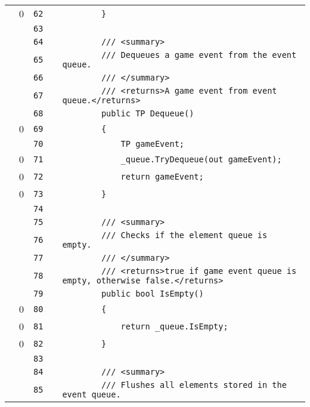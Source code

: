 \documentclass[a4paper,landscape,10pt]{article}
\begin{document}
\begin{longtable}[l]{lrrll}
\cellcolor{red} & 0 & \verb~62~ & & \verb~        }~\\
\cellcolor{gray} &  & \verb~63~ & & \verb~~\\
\cellcolor{gray} &  & \verb~64~ & & \verb~        /// <summary>~\\
\cellcolor{gray} &  & \verb~65~ & & \verb~        /// Dequeues a game event from the event queue.~\\
\cellcolor{gray} &  & \verb~66~ & & \verb~        /// </summary>~\\
\cellcolor{gray} &  & \verb~67~ & & \verb~        /// <returns>A game event from event queue.</returns>~\\
\cellcolor{gray} &  & \verb~68~ & & \verb~        public TP Dequeue()~\\
\cellcolor{red} & 0 & \verb~69~ & & \verb~        {~\\
\cellcolor{gray} &  & \verb~70~ & & \verb~            TP gameEvent;~\\
\cellcolor{red} & 0 & \verb~71~ & & \verb~            _queue.TryDequeue(out gameEvent);~\\
\cellcolor{red} & 0 & \verb~72~ & & \verb~            return gameEvent;~\\
\cellcolor{red} & 0 & \verb~73~ & & \verb~        }~\\
\cellcolor{gray} &  & \verb~74~ & & \verb~~\\
\cellcolor{gray} &  & \verb~75~ & & \verb~        /// <summary>~\\
\cellcolor{gray} &  & \verb~76~ & & \verb~        /// Checks if the element queue is empty.~\\
\cellcolor{gray} &  & \verb~77~ & & \verb~        /// </summary>~\\
\cellcolor{gray} &  & \verb~78~ & & \verb~        /// <returns>true if game event queue is empty, otherwise false.</returns>~\\
\cellcolor{gray} &  & \verb~79~ & & \verb~        public bool IsEmpty()~\\
\cellcolor{red} & 0 & \verb~80~ & & \verb~        {~\\
\cellcolor{red} & 0 & \verb~81~ & & \verb~            return _queue.IsEmpty;~\\
\cellcolor{red} & 0 & \verb~82~ & & \verb~        }~\\
\cellcolor{gray} &  & \verb~83~ & & \verb~~\\
\cellcolor{gray} &  & \verb~84~ & & \verb~        /// <summary>~\\
\cellcolor{gray} &  & \verb~85~ & & \verb~        /// Flushes all elements stored in the event queue.~\\

\end{longtable}
\end{document}
